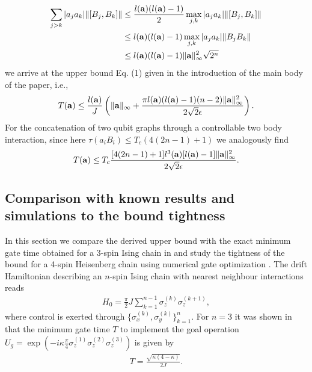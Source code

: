 \documentclass[aps,twocolumn,amsmath,amssymb,nofootinbib,superscriptaddress]{revtex4-1}
\begin{document}
\begin{align}
\sum_{j>k}|a_{j}a_{k}|\Vert[B_{j},B_{k}]\Vert&\leq \frac{l(\bold{a})(l(\bold{a})-1)}{2}\max_{j,k}|a_{j}a_{k}|\Vert[B_{j},B_{k}]\Vert\nonumber \\
&\leq l(\bold{a})(l(\bold{a})-1)\max_{j,k}|a_{j}a_{k}|\Vert B_{j}B_{k}\Vert \nonumber \\
&\leq l(\bold{a})(l(\bold{a})-1)\Vert\bold{a}\Vert_{\infty}^{2}\sqrt{2^{n}}
\end{align}
we arrive at the upper bound Eq. (1) given in the introduction of the main body of the paper, i.e.,
\begin{align}
\label{eq:boundfinalapp}
T(\bold{a})\leq\frac{l(\bold{a})}{J}\left(\Vert \bold{a}\Vert_{\infty}+\frac{\pi l(\bold{a})(l(\bold{a})-1)(n-2)\Vert \bold{a}\Vert_{\infty}^{2}}{2\sqrt{2}\epsilon}   \right).	
\end{align}
For the concatenation of two qubit graphs through a controllable two body interaction, since here $\tau(a_{i}B_{i})\leq T_{c}(4(2n-1)+1)$ we analogously find 
\begin{align}
T(\bold{a})\leq T_{c}\frac{[4(2n-1)+1]l^{3}(\bold{a})[l(\bold{a})-1]\Vert\bold{a}\Vert_{\infty}^{2}}{2\sqrt{2}\epsilon}.
\end{align}	



\subsection*{Comparison with known results and simulations to the bound tightness}
In this section we compare the derived upper bound with the exact minimum gate time obtained for a 3-spin Ising chain in \cite{ExactCalc2} and study the tightness of the bound for a 4-spin Heisenberg chain using numerical gate optimization \cite{Grape, QuTip1, QuTip2}. 
The drift Hamiltonian describing an $n$-spin Ising chain with nearest neighbour interactions reads 
\begin{align}
\label{eq:Ising}
H_{0}=\frac{\pi}{2} J\sum_{k=1}^{n-1}\sigma_{z}^{(k)}\sigma_{z}^{(k+1)},
\end{align}
where control is exerted through $\{\sigma_{x}^{(k)},\sigma_{y}^{(k)}\}_{k=1}^{n}$. For $n=3$ it was shown in \cite{ExactCalc2} that the minimum gate time $T$ to implement the goal operation $U_{g}=\exp(-i\kappa\frac{\pi}{4}\sigma_{z}^{(1)}\sigma_{z}^{(2)}\sigma_{z}^{(3)})$  is given by 
\begin{align}
\label{eq:exact}
T=\frac{\sqrt{\kappa(4-\kappa)}}{2J}.
\end{align}
\end{document}
